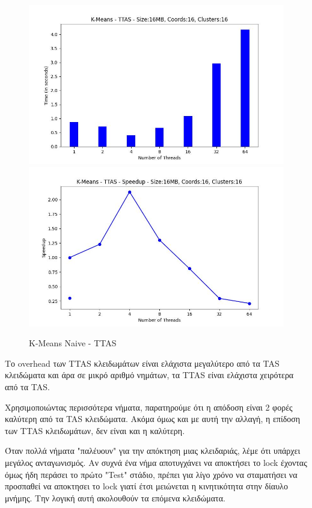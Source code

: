 \documentclass[letterpaper,12pt]{article}
\begin{document}
\begin{figure}[H]
    \centering
        \includegraphics[scale=0.4]{outFilesAffinityMouliko/plots/kmeans_locks_ttas.jpg}
        \includegraphics[scale=0.4]{outFilesAffinityMouliko/plots/kmeans_locks_ttas_speedup.jpg}
    \caption{K-Means Naive - TTAS}
    \label{fig:K-Means Naive - TTAS}
\end{figure}

Το overhead των TTAS κλειδωμάτων είναι ελάχιστα μεγαλύτερο από τα TAS κλειδώματα και άρα σε 
μικρό αριθμό νημάτων, τα TTAS είναι ελάχιστα χειρότερα από τα TAS.

Χρησιμοποιώντας περισσότερα νήματα, παρατηρούμε ότι η απόδοση είναι 2 φορές καλύτερη από τα 
TAS κλειδώματα. Ακόμα όμως και με αυτή την αλλαγή, η επίδοση των TTAS κλειδωμάτων, δεν είναι και η
καλύτερη. 

Όταν πολλά νήματα "παλέυουν" για την απόκτηση μιας κλειδαριάς, λέμε ότι υπάρχει μεγάλος ανταγωνισμός.
Αν συχνά ένα νήμα αποτυγχάνει να αποκτήσει το lock έχοντας όμως ήδη περάσει το πρώτο "Test" στάδιο,
πρέπει για λίγο χρόνο να σταματήσει να προσπαθεί να αποκτησει το lock γιατί έτσι μειώνεται η 
κινητικότητα στην δίαυλο μνήμης. Την λογική αυτή ακολουθούν τα επόμενα κλειδώματα.
\end{document}

